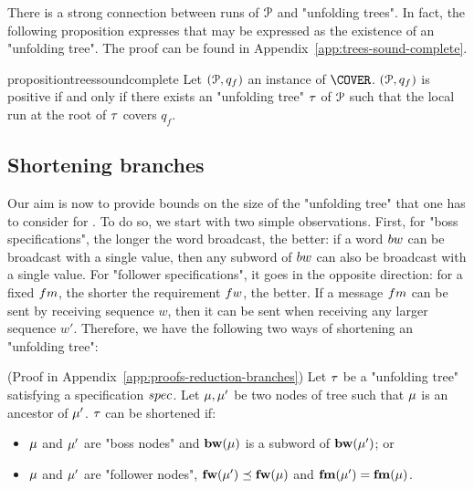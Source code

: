 
There is a strong connection between runs of $\mathcal{P}$ and "unfolding trees". In fact, the following proposition expresses that \COVER may be expressed as the existence of an "unfolding tree". 
The proof can be found in Appendix~\ref{app:trees-sound-complete}.


\begin{restatable}{proposition}{treessoundcomplete}
\label{prop:trees-sound-complete}
Let $(\mathcal{P},q_f)$ an instance of $\COVER$. $(\mathcal{P},q_f)$ is positive if and only if there exists an "unfolding tree" $\tau$ of $\mathcal{P}$ such that the local run at the root of $\tau$ covers $q_f$.
\end{restatable}



\subsection{Shortening branches}
\label{sec:decidability-shortening-branches}

Our aim is now to provide bounds on the size of the "unfolding tree" that one has to consider for \COVER. To do so, we start with two simple observations. First, for "boss specifications", the longer the word broadcast, the better: if a word $\bossspec$ can be broadcast with a single value, then any subword of $\bossspec$ can also be broadcast with a single value. 
For "follower specifications", it goes in the opposite direction: for a fixed $\followmessagespec$, the shorter the requirement $\followwordspec$, the better. If a message $\followmessagespec$ can be sent by receiving sequence $w$, then it can be sent when receiving any larger sequence $w'$.
Therefore, we have the following two ways of shortening an "unfolding tree":

\begin{lemma}(Proof in Appendix~\ref{app:proofs-reduction-branches}) 
\label{lem:shortening-branches}
	Let $\tau$ be a "unfolding tree" satisfying a specification $\spec$.
	Let $\mu, \mu'$ be two nodes of tree such that $\mu$ is an ancestor of $\mu'$.
	$\tau$ can be shortened if:
	\begin{itemize}
	\item $\mu$ and $\mu'$ are "boss nodes" and $\mathbf{bw}(\mu)$ is a subword of $\mathbf{bw}(\mu')$; or
	\item $\mu$ and $\mu'$ are "follower nodes", $\mathbf{fw}(\mu') \preceq \mathbf{fw}(\mu)$ and $\mathbf{fm}(\mu')=\mathbf{fm}(\mu)$. 
	\end{itemize}
\end{lemma}

